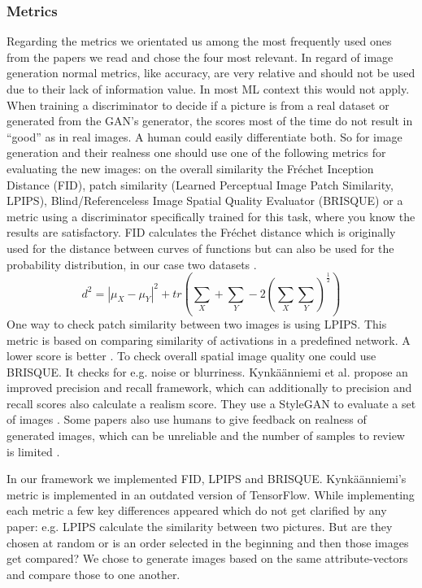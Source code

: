 \documentclass[12pt, a4paper]{article}
\begin{document}
\subsubsection{Metrics}\label{metrics}
Regarding the metrics we orientated us among the most frequently used ones from the papers we read and chose the four most relevant. 
In regard of image generation normal metrics, like accuracy, are very relative and should not be used due to their lack of information value. In most ML context this would not apply. When training a discriminator to decide if a picture is from a real dataset or generated from the GAN's generator, the scores most of the time do not result in ``good'' as in real images. A human could easily differentiate both. 
So for image generation and their realness one should use one of the following metrics for evaluating the new images: on the overall similarity the Fréchet Inception Distance (FID), patch similarity (Learned Perceptual Image Patch Similarity, LPIPS), Blind/Referenceless Image Spatial Quality Evaluator (BRISQUE) or a metric using a discriminator specifically trained for this task, where you know the results are satisfactory.
FID calculates the Fréchet distance which is originally used for the distance between curves of functions but can also be used for the probability distribution, in our case two datasets \cite{NIPS2017_8a1d6947}. $$d^2 = |\mu_X - \mu_Y|^2 + tr(\sum_X + \sum_Y - 2 (\sum_X \sum_Y)^{\frac{1}{2}})$$
One way to check patch similarity between two images is using LPIPS. This metric is based on comparing similarity of activations in a predefined network. A lower score is better \cite{DBLP}. 
To check overall spatial image quality one could use BRISQUE. It checks for e.g. noise or blurriness. 
Kynkäänniemi et al. propose an improved precision and recall framework, which can additionally to precision and recall scores also calculate a realism score. They use a StyleGAN to evaluate a set of images \cite{NEURIPS2019_0234c510}.
Some papers also use humans to give feedback on realness of generated images, which can be unreliable and the number of samples to review is limited \cite{Xia_2021_CVPR}.

In our framework we implemented FID, LPIPS and BRISQUE. Kyn\-kään\-niemi's metric is implemented in an outdated version of TensorFlow. 
While implementing each metric a few key differences appeared which do not get clarified by any paper: e.g. LPIPS calculate the similarity between two pictures. 
But are they chosen at random or is an order selected in the beginning and then those images get compared? We chose to generate images based on the same attribute-vectors and compare those to one another.
\end{document}
